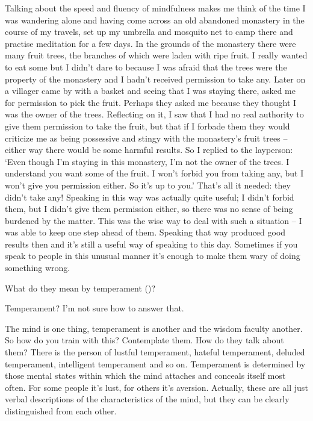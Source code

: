Talking about the speed and fluency of mindfulness makes me think of the time I was wandering alone and having come across an old abandoned monastery in the course of my travels, set up my umbrella and mosquito net to camp there and practise meditation for a few days. In the grounds of the monastery there were many fruit trees, the branches of which were laden with ripe fruit. I really wanted to eat some but I didn't dare to because I was afraid that the trees were the property of the monastery and I hadn't received permission to take any. Later on a villager came by with a basket and seeing that I was staying there, asked me for permission to pick the fruit. Perhaps they asked me because they thought I was the owner of the trees. Reflecting on it, I saw that I had no real authority to give them permission to take the fruit, but that if I forbade them they would criticize me as being possessive and stingy with the monastery's fruit trees -- either way there would be some harmful results. So I replied to the layperson: `Even though I'm staying in this monastery, I'm not the owner of the trees. I understand you want some of the fruit. I won't forbid you from taking any, but I won't give you permission either. So it's up to you.' That's all it needed: they didn't take any! Speaking in this way was actually quite useful; I didn't forbid them, but I didn't give them permission either, so there was no sense of being burdened by the matter. This was the wise way to deal with such a situation -- I was able to keep one step ahead of them. Speaking that way produced good results then and it's still a useful way of speaking to this day. Sometimes if you speak to people in this unusual manner it's enough to make them wary of doing something wrong.

What do they mean by temperament ()?

 Temperament? I'm not sure how to answer that.

 The mind is one thing, temperament is another and the wisdom faculty another. So how do you train with this? Contemplate them. How do they talk about them? There is the person of lustful temperament, hateful temperament, deluded temperament, intelligent temperament and so on. Temperament is determined by those mental states within which the mind attaches and conceals itself most often. For some people it's lust, for others it's aversion. Actually, these are all just verbal descriptions of the characteristics of the mind, but they can be clearly distinguished from each other.

